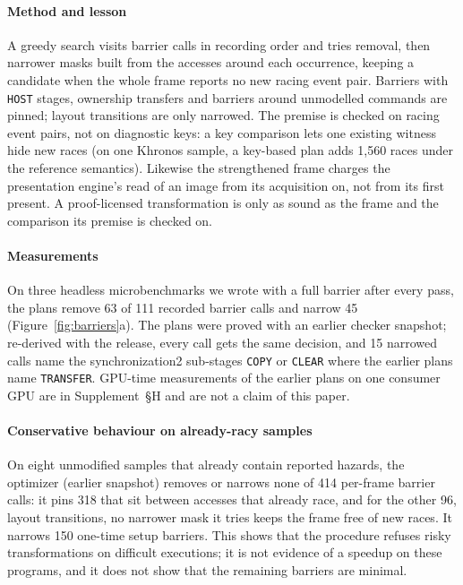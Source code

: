 \documentclass[acmtog,anonymous,review]{acmart}
\newcommand{\code}[1]{\texttt{#1}}
\newcommand{\supp}[1]{Supplement~\S#1}
\begin{document}


\paragraph{Method and lesson}
A greedy search visits barrier calls in recording order and tries removal, then narrower masks built from the accesses
around each occurrence, keeping a candidate when the whole frame reports no new racing event pair. Barriers with
\code{HOST} stages, ownership transfers and barriers around unmodelled commands are pinned; layout transitions are
only narrowed. The premise is checked on racing event pairs, not on diagnostic keys: a key comparison lets one
existing witness hide new races (on one Khronos sample, a key-based plan adds 1,560 races under the reference
semantics). Likewise the strengthened frame charges the presentation engine's read of an image from its acquisition
on, not from its first present. A proof-licensed transformation is only as sound as the frame and the comparison its
premise is checked on.

\paragraph{Measurements}
\label{sec:eval-elide}
On three headless microbenchmarks we wrote with a full barrier after every pass, the plans remove 63 of 111 recorded
barrier calls and narrow 45 (Figure~\ref{fig:barriers}a). The plans were proved with an earlier checker snapshot;
re-derived with the release, every call gets the same decision, and 15 narrowed calls name the synchronization2
sub-stages \code{COPY} or \code{CLEAR} where the earlier plans name \code{TRANSFER}. GPU-time measurements of the
earlier plans on one consumer GPU are in \supp{H} and are not a claim of this paper.

\paragraph{Conservative behaviour on already-racy samples}
On eight unmodified samples that already contain reported hazards, the optimizer (earlier snapshot) removes or narrows
none of 414 per-frame barrier calls: it pins 318 that sit between accesses that already race, and for the other 96,
layout transitions, no narrower mask it tries keeps the frame free of new races. It narrows 150 one-time setup
barriers. This shows that the procedure refuses risky transformations on difficult executions; it is not evidence of
a speedup on these programs, and it does not show that the remaining barriers are minimal.
\end{document}
